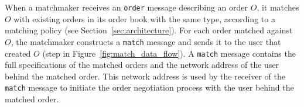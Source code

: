 When a matchmaker receives an \texttt{order} message describing an order $ O $, it matches $ O $ with existing orders in its order book with the same type, according to a matching policy (see Section~\ref{sec:architecture}).
For each order matched against $ O $, the matchmaker constructs a \texttt{match} message and sends it to the user that created $ O $ (step  in Figure~\ref{fig:match_data_flow}).
A \texttt{match} message contains the full specifications of the matched orders and the network address of the user behind the matched order.
This network address is used by the receiver of the \texttt{match} message to initiate the order negotiation process with the user behind the matched order.







